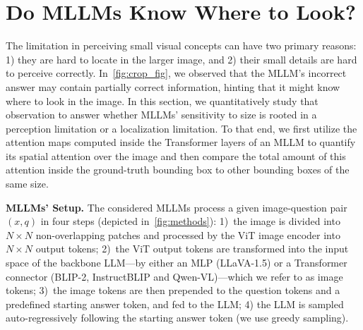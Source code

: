 \section{Do MLLMs Know Where to Look?}

\label{sec:where_to_look}
The limitation in perceiving small visual concepts can have two primary reasons: 1) they are hard to locate in the larger image, and 2) their small details are hard to perceive correctly. In~\cref{fig:crop_fig}, we observed that the MLLM's incorrect answer may contain partially correct information, hinting that it might know where to look in the image. In this section, we quantitatively study that observation to answer whether MLLMs' sensitivity to size is rooted in a perception limitation or a localization limitation. To that end, we first utilize the attention maps computed inside the Transformer layers of an MLLM to quantify its spatial attention over the image and then compare the total amount of this attention inside the ground-truth bounding box to other bounding boxes of the same size.

\textbf{MLLMs' Setup.} The considered MLLMs process a given image-question pair $(x,q)$ in four steps (depicted in~\cref{fig:methods}): 1)~the image is divided into $N\times N$ non-overlapping patches and processed by the ViT image encoder into $N\times N$ output tokens; 2)~the ViT output tokens are transformed into the input space of the backbone LLM---by either an MLP (LLaVA-1.5) or a Transformer connector (BLIP-2, InstructBLIP and Qwen-VL)---which we refer to as image tokens; 3)~the image tokens are then prepended to the question tokens and a predefined starting answer token, and fed to the LLM; 4) the LLM is sampled auto-regressively following the starting answer token (we use greedy sampling).


